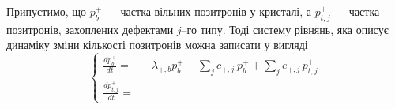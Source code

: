 \documentclass[10pt,a5paper,titlepage,oneside]{book}
\numberwithin{equation}{part}
\begin{document}
Припустимо, що 
$p_{b}^+$ --- частка вільних позитронів у кристалі, а
$p_{t,j}^+$  --- частка позитронів, захоплених дефектами $j$--го типу.
Тоді систему рівнянь, яка описує динаміку зміни кількості позитронів можна записати у вигляді
\begin{equation}\label{PASdin}
\left\{
\begin{aligned}%
\frac{dp_{b}^+}{dt}=& -\lambda_{+,b} p_{b}^+ - \sum_j c_{+,j} \:p_{b}^+ + \sum_j e_{+,j} \,p_{t,j}^+ \\
\frac{dp_{t,j}^+}{dt}=& 
\end{aligned} \right. 
\end{equation}









\end{document}
